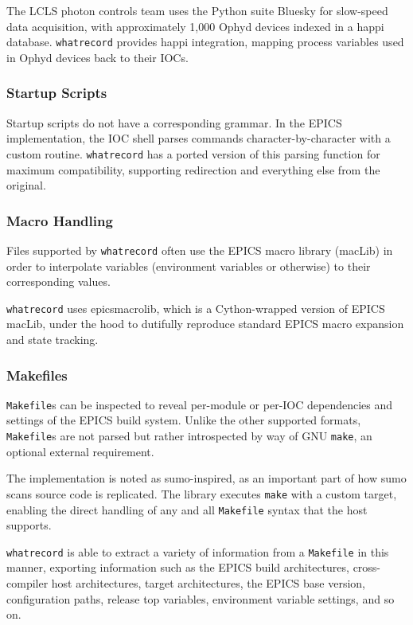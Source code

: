 \documentclass[letter,
               keeplastbox,   %
               ]{jacow}
\begin{document}
The LCLS photon controls team uses the Python suite Bluesky\cite{bluesky} for
slow-speed data acquisition, with approximately 1,000 Ophyd devices indexed in
a happi\cite{happi} database.  \verb_whatrecord_ provides happi integration,
mapping process variables used in Ophyd devices back to their IOCs.

\subsubsection{Startup Scripts} Startup scripts do not have a corresponding
grammar. In the EPICS implementation, the IOC shell parses commands
character-by-character with a custom routine.  \verb_whatrecord_ has a ported
version of this parsing function for maximum compatibility, supporting
redirection and everything else from the original.

\subsubsection{Macro Handling} Files supported by \verb_whatrecord_ often use
the EPICS macro library (macLib) in order to interpolate variables (environment
variables or otherwise) to their corresponding values.

\verb_whatrecord_ uses epicsmacrolib\cite{epicsmacrolib}, which is a
Cython-wrapped version of EPICS macLib, under the hood to dutifully reproduce
standard EPICS macro expansion and state tracking.

\subsubsection{Makefiles} \verb_Makefile_s can be inspected to reveal
per-module or per-IOC dependencies and settings of the EPICS build system.
Unlike the other supported formats, \verb_Makefile_s are not parsed but rather
introspected by way of GNU \verb_make_, an optional external requirement.

The implementation is noted as sumo\cite{sumo}-inspired, as an important part
of how sumo scans source code is replicated. The library executes \verb_make_
with a custom target, enabling the direct handling of any and all
\verb_Makefile_ syntax that the host supports.

\verb_whatrecord_ is able to extract a variety of information from a
\verb_Makefile_ in this manner, exporting information such as the EPICS build
architectures, cross-compiler host architectures, target architectures, the
EPICS base version, configuration paths, release top variables, environment
variable settings, and so on.
\end{document}

